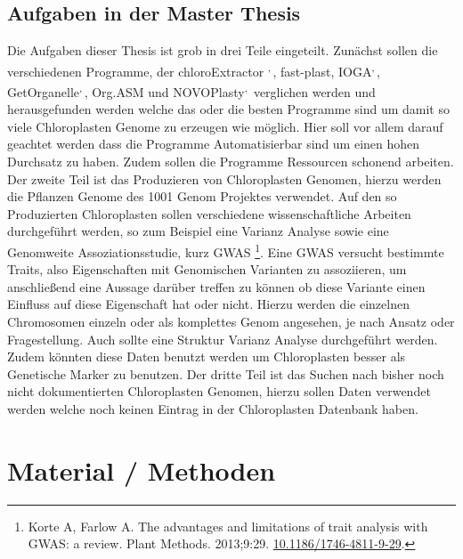 \documentclass{scrartcl}
\begin{document}
\subsection{Aufgaben in der Master Thesis}
\label{sec-1-7}
Die Aufgaben dieser Thesis ist grob in drei Teile eingeteilt. Zunächst sollen die verschiedenen Programme, der chloroExtractor \footnotemark[9]{}\textsuperscript{,}\,\footnotemark[10]{}, fast-plast\footnotemark[15]{}, IOGA\footnotemark[23]{}\textsuperscript{,}\,\footnotemark[24]{}, GetOrganelle\footnotemark[21]{}\textsuperscript{,}\,\footnotemark[22]{},
Org.ASM \footnotemark[18]{}und NOVOPlasty\footnotemark[16]{}\textsuperscript{,}\,\footnotemark[17]{} verglichen werden und herausgefunden werden welche das oder die besten Programme sind um damit so viele Chloroplasten Genome zu erzeugen wie 
möglich. Hier soll vor allem darauf geachtet werden dass die Programme Automatisierbar sind um einen hohen Durchsatz zu haben. Zudem sollen die Programme Ressourcen schonend arbeiten. 
Der zweite Teil ist das Produzieren von Chloroplasten Genomen, hierzu werden die Pflanzen Genome des 1001 Genom Projektes verwendet. Auf den so
Produzierten Chloroplasten sollen verschiedene wissenschaftliche Arbeiten durchgeführt werden, so zum Beispiel eine Varianz Analyse sowie eine Genomweite Assoziationsstudie, kurz GWAS \footnote{Korte A, Farlow A. The advantages and limitations of trait analysis with GWAS: a review. Plant Methods. 2013;9:29. \url{10.1186/1746-4811-9-29}.}.
Eine GWAS versucht bestimmte Traits, also Eigenschaften mit Genomischen Varianten zu assoziieren, um anschließend eine Aussage darüber treffen zu können ob diese Variante einen Einfluss auf diese 
Eigenschaft hat oder nicht. Hierzu werden die einzelnen Chromosomen einzeln oder als komplettes Genom angesehen, je nach Ansatz oder Fragestellung.
Auch sollte eine Struktur Varianz Analyse durchgeführt werden. Zudem könnten diese Daten benutzt werden um Chloroplasten besser als Genetische Marker zu benutzen. 
Der dritte Teil ist das Suchen nach bisher noch nicht dokumentierten Chloroplasten Genomen, hierzu sollen Daten verwendet werden welche noch keinen Eintrag in der Chloroplasten Datenbank haben.



\section{Material / Methoden}
\label{sec-2}
\end{document}
